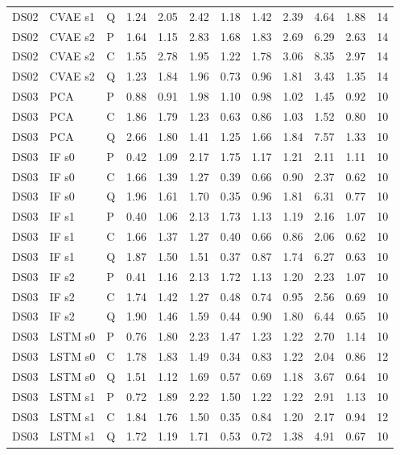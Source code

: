 \documentclass[10pt]{article}
\begin{document}
{\begin{longtable}{lllrrrrrrrrr}
DS02 & CVAE s1 & Q & 1.24 & 2.05 & 2.42 & 1.18 & 1.42 & 2.39 & 4.64 & 1.88 & 14 \\
DS02 & CVAE s2 & P & 1.64 & 1.15 & 2.83 & 1.68 & 1.83 & 2.69 & 6.29 & 2.63 & 14 \\
DS02 & CVAE s2 & C & 1.55 & 2.78 & 1.95 & 1.22 & 1.78 & 3.06 & 8.35 & 2.97 & 14 \\
DS02 & CVAE s2 & Q & 1.23 & 1.84 & 1.96 & 0.73 & 0.96 & 1.81 & 3.43 & 1.35 & 14 \\
\midrule
DS03 & PCA & P & 0.88 & 0.91 & 1.98 & 1.10 & 0.98 & 1.02 & 1.45 & 0.92 & 10 \\
DS03 & PCA & C & 1.86 & 1.79 & 1.23 & 0.63 & 0.86 & 1.03 & 1.52 & 0.80 & 10 \\
DS03 & PCA & Q & 2.66 & 1.80 & 1.41 & 1.25 & 1.66 & 1.84 & 7.57 & 1.33 & 10 \\
DS03 & IF s0 & P & 0.42 & 1.09 & 2.17 & 1.75 & 1.17 & 1.21 & 2.11 & 1.11 & 10 \\
DS03 & IF s0 & C & 1.66 & 1.39 & 1.27 & 0.39 & 0.66 & 0.90 & 2.37 & 0.62 & 10 \\
DS03 & IF s0 & Q & 1.96 & 1.61 & 1.70 & 0.35 & 0.96 & 1.81 & 6.31 & 0.77 & 10 \\
DS03 & IF s1 & P & 0.40 & 1.06 & 2.13 & 1.73 & 1.13 & 1.19 & 2.16 & 1.07 & 10 \\
DS03 & IF s1 & C & 1.66 & 1.37 & 1.27 & 0.40 & 0.66 & 0.86 & 2.06 & 0.62 & 10 \\
DS03 & IF s1 & Q & 1.87 & 1.50 & 1.51 & 0.37 & 0.87 & 1.74 & 6.27 & 0.63 & 10 \\
DS03 & IF s2 & P & 0.41 & 1.16 & 2.13 & 1.72 & 1.13 & 1.20 & 2.23 & 1.07 & 10 \\
DS03 & IF s2 & C & 1.74 & 1.42 & 1.27 & 0.48 & 0.74 & 0.95 & 2.56 & 0.69 & 10 \\
DS03 & IF s2 & Q & 1.90 & 1.46 & 1.59 & 0.44 & 0.90 & 1.80 & 6.44 & 0.65 & 10 \\
DS03 & LSTM s0 & P & 0.76 & 1.80 & 2.23 & 1.47 & 1.23 & 1.22 & 2.70 & 1.14 & 10 \\
DS03 & LSTM s0 & C & 1.78 & 1.83 & 1.49 & 0.34 & 0.83 & 1.22 & 2.04 & 0.86 & 12 \\
DS03 & LSTM s0 & Q & 1.51 & 1.12 & 1.69 & 0.57 & 0.69 & 1.18 & 3.67 & 0.64 & 10 \\
DS03 & LSTM s1 & P & 0.72 & 1.89 & 2.22 & 1.50 & 1.22 & 1.22 & 2.91 & 1.13 & 10 \\
DS03 & LSTM s1 & C & 1.84 & 1.76 & 1.50 & 0.35 & 0.84 & 1.20 & 2.17 & 0.94 & 12 \\
DS03 & LSTM s1 & Q & 1.72 & 1.19 & 1.71 & 0.53 & 0.72 & 1.38 & 4.91 & 0.67 & 10 \\

\end{longtable}}
\end{document}
